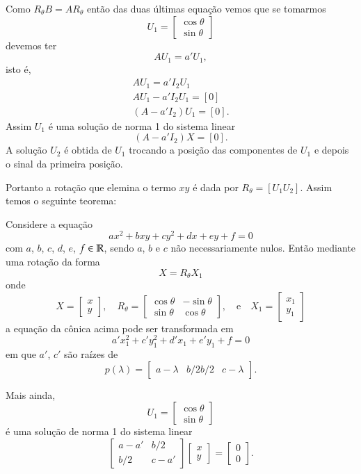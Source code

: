 Como $R_\theta B = AR_\theta$ então das duas últimas equação vemos que se tomarmos
\[
  U_1 = \begin{bmatrix}
    \cos\theta\\
    \sin\theta
  \end{bmatrix}
\]
devemos ter
\[
  AU_1 = a'U_1,
\]
isto é,
\begin{align*}
  AU_1 = a'I_2 U_1\\
  AU_1 - a'I_2 U_1 = [0]\\
  (A - a'I_2)U_1 = [0].
\end{align*}
Assim $U_1$ é uma solução de norma 1 do sistema linear
\[
  (A - a'I_2)X = [0].
\]
A solução $U_2$ é obtida de $U_1$ trocando a posição das componentes de $U_1$ e depois o sinal da primeira posição.

Portanto a rotação que elemina o termo $xy$ é dada por $R_\theta = [U_1 U_2]$. Assim temos o seguinte teorema:

\begin{teorema}
  Considere a equação
  \[
      ax^2 + bxy + cy^2 + dx + ey + f = 0
  \]
  com $a$, $b$, $c$, $d$, $e$, $f \in \mathbb{R}$, sendo $a$, $b$ e $c$ não necessariamente nulos. Então mediante uma rotação da forma
  \[
    X = R_\theta X_1
  \]
  onde
  \[
    X = \begin{bmatrix}
      x\\y
    \end{bmatrix}, \quad
    R_\theta = \begin{bmatrix}
    \cos\theta & -\sin\theta\\
    \sin\theta & \cos\theta
  \end{bmatrix}, \quad\mbox{e}\quad
  X_1 = \begin{bmatrix}
    x_1\\y_1
  \end{bmatrix}
  \]
  a equação da cônica acima pode ser transformada em
  \[
    a'x_1^2 + c'y_1^2 + d'x_1 + e'y_1 + f = 0
  \]
  em que $a'$, $c'$ são raízes de
  \[
    p(\lambda) = \begin{bmatrix}
      a - \lambda & b/2
      b/2 & c - \lambda
    \end{bmatrix}.
  \]

  Mais ainda,
  \[
    U_1 = \begin{bmatrix}
      \cos\theta\\ \sin\theta
    \end{bmatrix}
  \]
  é uma solução de norma 1 do sistema linear
  \[
    \begin{bmatrix}
      a - a' & b/2\\
      b/2 & c - a'
    \end{bmatrix} \begin{bmatrix}
      x\\y
    \end{bmatrix} = \begin{bmatrix}
      0\\0
    \end{bmatrix}.
  \]
\end{teorema}



